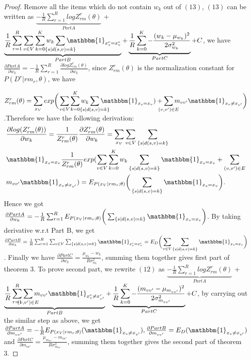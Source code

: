 \documentclass[conference]{IEEEtran}
\begin{document}
 \begin{proof}
     Remove all the items which do not contain $w_{k}$ out of $(13)$, $(13)$ can be written as 
     $\underbrace{-\frac{1}{R}\sum_{r=1}^{R}logZ_{rm}^{r}(\theta)}_{Part A}$ +  $\underbrace{\frac{1}{R}\sum_{r=1}^{R}\sum_{v\in V}\sum_{k=0}^{K}w_{k}\smashoperator{\sum_{\{s|d(s,v)=k\}}} \mathbbm{1}_{x^{r}_{s}=x^{r}_{v}}}_{Part B} + \underbrace{\frac{1}{R} \sum_{k=0}^{K} -\frac{(w_{k}-\mu_{w_{k}})^{2}}{2\sigma_{w_{k}}^{2}}}_{Part C} + C$, we have $\frac{\partial Part A}{\partial w_{k}} = -\frac{1}{R}\sum_{r=1}^{R} \frac{\partial logZ_{rm}^{r}(\theta)}{\partial w_{k}}$, since $Z_{rm}^{r}(\theta)$ is the normalization constant for $P(D^{r}|rm_{r},\theta)$, we have 
     
     $Z_{rm}^{r}(\theta) = \smashoperator{\sum_{x_{V}}} exp\bigg(\smashoperator{\sum_{v\in V}}\smashoperator{\sum_{k=0}^{K}} w_{k} \smashoperator{\sum_{\substack{\{s|d(s,v)=k\}}}} \mathbbm{1}_{x_{s}=x_{v}})+\smashoperator{\sum_{(v,v')\in E}} m_{vv'}\mathbbm{1}_{x_{v}\neq x_{v'}}\bigg)$.Therefore we have the following derivation:
     \begin{align*}
     &\frac{\partial log(Z_{rm}^{r}(\theta))}{\partial w_{k}} =\frac{1}{Z_{rm}^{r}(\theta)}\frac{\partial Z_{rm}^{r}(\theta)}{\partial w_{k}} = \sum\limits_{x_{V}} \sum\limits_{v\in V}\sum\limits_{\{s|d(s,v)=k\}} \\&\mathbbm{1}_{x_{s}=x_{v}}  \frac{1}{Z_{rm}^{r}(\theta)}exp(\sum\limits_{v\in V}\sum\limits_{k=0}^{K} w_{k} \sum\limits_{\substack{\{s|d(s,v)=k\}}} \mathbbm{1}_{x_{s}=x_{v}}+\sum_{(v,v')\in E}\\& m_{vv'}\mathbbm{1}_{x_{v}\neq x_{v'}}) = E_{P(x_{V}|rm_{r};\theta)}\bigg(\sum_{\{s|d(s,v)=k\}} \mathbbm{1}_{x_{s}=x_{v}}\bigg).
     \end{align*}
      Hence we got $\frac{\partial Part A}{\partial w_{k}} = -\frac{1}{R}\sum_{r=1}^{R} E_{P(x_{V}|rm_{r};\theta)}\bigg(\sum_{\{s|d(s,v)=k\}} \mathbbm{1}_{x_{s}=x_{v}}\bigg)$. By taking derivative w.r.t Part B, we get $\frac{\partial Part B}{\partial w_{k}} = \frac{1}{R}\sum_{r=1}^{R}\sum_{v\in V}\sum_{\{s|d(s,v)=k\}} \mathbbm{1}_{x^{r}_{s}=x^{r}_{v}} = E_{D}\bigg(\smashoperator{\sum_{v\in V}} \sum_{\{s|d(s,v)=k\}} \mathbbm{1}_{x_{s}=x_{v}}\bigg)$. Finally we have $\frac{\partial Part C}{\partial w_{k}} = \frac{\mu_{w_{k}}-{w}_{k}}{R\sigma_{w_{k}}^{2}}$, summing them together gives first part of theorem 3. To prove second part, we rewrite $(12)$ as $\underbrace{-\frac{1}{R}\sum_{r=1}^{R}logZ_{rm}^{r}(\theta)}_{Part A}$ +  $\underbrace{\frac{1}{R}\sum_{r=1}^{R} \smashoperator{\sum_{(v,v')\in E}} m_{vv'} \mathbbm{1}_{x^{r}_{v}\neq x^{r}_{v'}}}_{Part B} + \underbrace{\frac{1}{R} \sum_{k=0}^{K} -\frac{(m_{vv'}-\mu_{m_{vv'}})^{2}}{2\sigma_{m_{vv'}}^{2}}}_{Part C} + C$, by carrying out the similar step as above, we get $\frac{\partial Part A}{\partial m_{vv'}} = -\frac{1}{R} E_{P(x_{V}|rm_{r};\theta)} (\mathbbm{1}_{x_{v}\neq x_{v'}}), \frac{\partial Part B}{\partial m_{vv'}} = E_{D}(\mathbbm{1}_{x_{v}\neq x_{v'}})$ and $\frac{\partial Part C}{\partial m_{vv'}} =\frac{\mu_{m_{vv'}}-m_{vv'}}{R\sigma_{m_{vv'}}^{2}}$, summing them together gives the second part of theorem 3.
 \end{proof}
\end{document}
